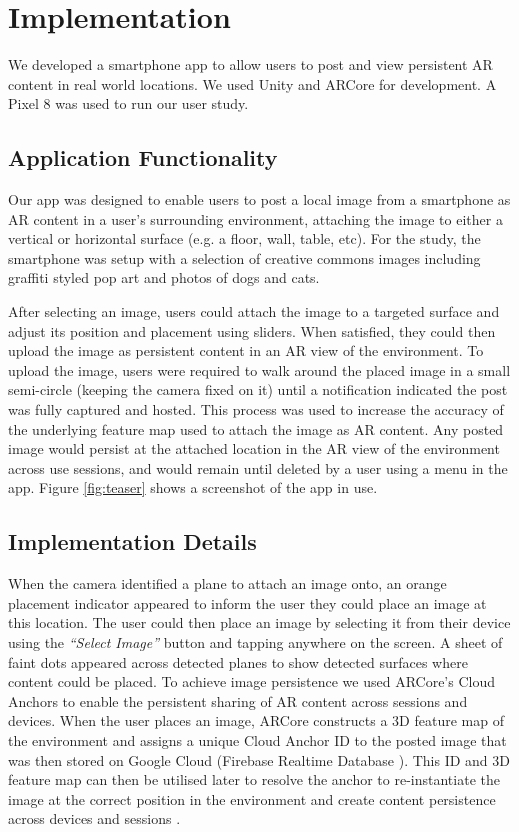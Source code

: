 \section{Implementation}
\label{implementation}
We developed a smartphone app to allow users to post and view persistent AR content in real world locations. 
We used Unity and ARCore for development. 
A Pixel 8 was used to run our user study. 



\subsection{Application Functionality}
Our app was designed to enable users to post a local image from a smartphone as AR content in a user's surrounding environment, attaching the image to either a vertical or horizontal surface (e.g. a floor, wall, table, etc).
For the study, the smartphone was setup with a selection of creative commons images including graffiti styled pop art and photos of dogs and cats.

After selecting an image, users could attach the image to a targeted surface and adjust its position and placement using sliders. 
When satisfied, they could then upload the image as persistent content in an AR view of the environment. 
To upload the image, users were required to walk around the placed image in a small semi-circle (keeping the camera fixed on it) until a notification indicated the post was fully captured and hosted.
This process was used to increase the accuracy of the underlying feature map used to attach the image as AR content. 
Any posted image would persist at the attached location in the AR view of the environment across use sessions, and would remain until deleted by a user using a menu in the app. 
Figure \ref{fig:teaser} shows a screenshot of the app in use.



\subsection{Implementation Details}
When the camera identified a plane to attach an image onto, an orange placement indicator appeared to inform the user they could place an image at this location. 
The user could then place an image by selecting it from their device using the \textit{``Select Image''} button and tapping anywhere on the screen. 
A sheet of faint dots appeared across detected planes to show detected surfaces where content could be placed.
To achieve image persistence we used ARCore’s Cloud Anchors \cite{design_3} to enable the persistent sharing of AR content across sessions and devices. 
When the user places an image, ARCore constructs a 3D feature map of the environment and assigns a unique Cloud Anchor ID to the posted image that was then stored on Google Cloud (Firebase Realtime Database \cite{design_7}). 
This ID and 3D feature map can then be utilised later to resolve the anchor to re-instantiate the image at the correct position in the environment and create content persistence across devices and sessions \cite{design_6}. 